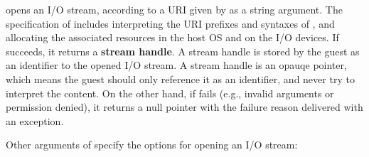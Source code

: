  opens an I/O stream, %
according to a URI given by  as a string argument. %
The specification of 
 includes interpreting the URI prefixes and syntaxes of ,
and allocating the associated resources in the host OS and on the I/O devices.
If  succeeds, it returns a {\bf stream handle}.
A stream handle is stored by the guest as an identifier to the opened I/O stream.
A stream handle is an opauqe pointer, which means the guest should only reference it as an identifier, and never try to interpret the content.
On the other hand, if  fails (e.g., invalid arguments or permission denied), it returns a null pointer with the failure reason delivered with an exception.


Other arguments of  specify the options for opening an I/O stream:


